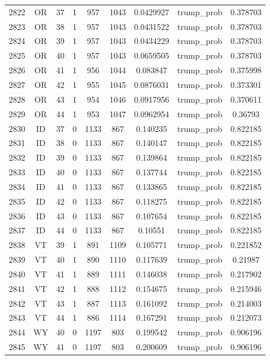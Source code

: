 \documentclass[12pt,a4paper]{article}
\begin{document}
\begin{tabular}{r|cccccccc}
	2822 & OR & 37 & 1 & 957 & 1043 & 0.0429927 & trump\_prob & 0.378703 \\
	2823 & OR & 38 & 1 & 957 & 1043 & 0.0431522 & trump\_prob & 0.378703 \\
	2824 & OR & 39 & 1 & 957 & 1043 & 0.0434229 & trump\_prob & 0.378703 \\
	2825 & OR & 40 & 1 & 957 & 1043 & 0.0659505 & trump\_prob & 0.378703 \\
	2826 & OR & 41 & 1 & 956 & 1044 & 0.083847 & trump\_prob & 0.375998 \\
	2827 & OR & 42 & 1 & 955 & 1045 & 0.0876031 & trump\_prob & 0.373301 \\
	2828 & OR & 43 & 1 & 954 & 1046 & 0.0917956 & trump\_prob & 0.370611 \\
	2829 & OR & 44 & 1 & 953 & 1047 & 0.0962954 & trump\_prob & 0.36793 \\
	2830 & ID & 37 & 0 & 1133 & 867 & 0.140235 & trump\_prob & 0.822185 \\
	2831 & ID & 38 & 0 & 1133 & 867 & 0.140147 & trump\_prob & 0.822185 \\
	2832 & ID & 39 & 0 & 1133 & 867 & 0.139864 & trump\_prob & 0.822185 \\
	2833 & ID & 40 & 0 & 1133 & 867 & 0.137744 & trump\_prob & 0.822185 \\
	2834 & ID & 41 & 0 & 1133 & 867 & 0.133865 & trump\_prob & 0.822185 \\
	2835 & ID & 42 & 0 & 1133 & 867 & 0.118275 & trump\_prob & 0.822185 \\
	2836 & ID & 43 & 0 & 1133 & 867 & 0.107654 & trump\_prob & 0.822185 \\
	2837 & ID & 44 & 0 & 1133 & 867 & 0.10551 & trump\_prob & 0.822185 \\
	2838 & VT & 39 & 1 & 891 & 1109 & 0.105771 & trump\_prob & 0.221852 \\
	2839 & VT & 40 & 1 & 890 & 1110 & 0.117639 & trump\_prob & 0.21987 \\
	2840 & VT & 41 & 1 & 889 & 1111 & 0.146038 & trump\_prob & 0.217902 \\
	2841 & VT & 42 & 1 & 888 & 1112 & 0.154675 & trump\_prob & 0.215946 \\
	2842 & VT & 43 & 1 & 887 & 1113 & 0.161092 & trump\_prob & 0.214003 \\
	2843 & VT & 44 & 1 & 886 & 1114 & 0.167291 & trump\_prob & 0.212073 \\
	2844 & WY & 40 & 0 & 1197 & 803 & 0.199542 & trump\_prob & 0.906196 \\
	2845 & WY & 41 & 0 & 1197 & 803 & 0.200609 & trump\_prob & 0.906196 \\

\end{tabular}
\end{document}
